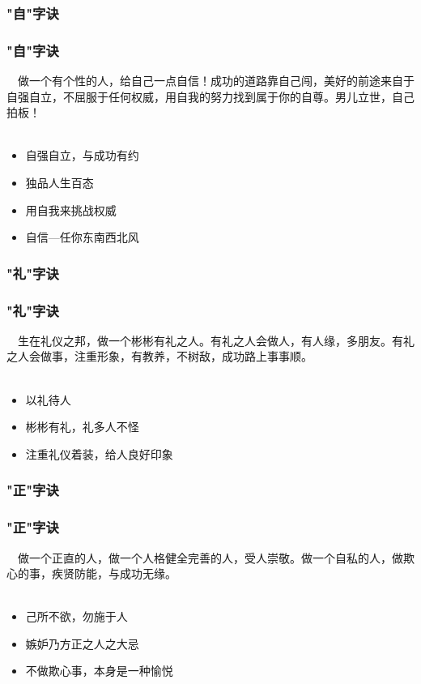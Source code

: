 \subsubsection{"自"字诀}
\begin{frame}
\frametitle{"自"字诀}
\noindent\handr~~做一个有个性的人，给自己一点自信！成功的道路靠自己闯，美好的前途来自于自强自立，不屈服于任何权威，用自我的努力找到属于你的自尊。男儿立世，自己拍板！
~\\
~\\
\begin{itemize}
    \item 自强自立，与成功有约
    \item 独品人生百态
    \item 用自我来挑战权威
    \item 自信—任你东南西北风
\end{itemize}
\end{frame}

\subsubsection{"礼"字诀}
\begin{frame}
\frametitle{"礼"字诀}
\noindent\handr~~生在礼仪之邦，做一个彬彬有礼之人。有礼之人会做人，有人缘，多朋友。有礼之人会做事，注重形象，有教养，不树敌，成功路上事事顺。
~\\
~\\
\begin{itemize}
    \item 以礼待人
    \item 彬彬有礼，礼多人不怪
    \item 注重礼仪着装，给人良好印象
\end{itemize}
\end{frame}

\subsubsection{"正"字诀}
\begin{frame}
\frametitle{"正"字诀}
\noindent\handr~~做一个正直的人，做一个人格健全完善的人，受人崇敬。做一个自私的人，做欺心的事，疾贤防能，与成功无缘。
~\\
~\\
\begin{itemize}
    \item 己所不欲，勿施于人
    \item 嫉妒乃方正之人之大忌
    \item 不做欺心事，本身是一种愉悦
\end{itemize}
\end{frame}

